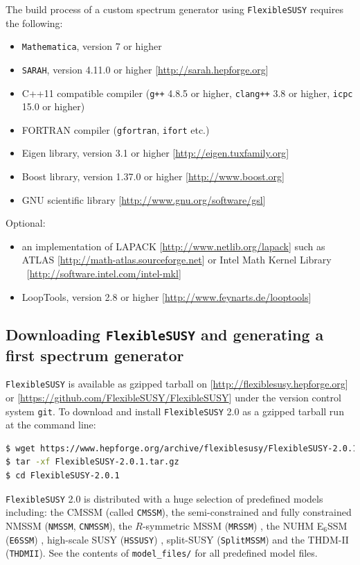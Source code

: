 \documentclass[final,3p,11pt,pdflatex]{elsarticle}
\makeatletter
\newcommand{\modelname}[1]{\texttt{#1}\@\xspace}
\newcommand{\sarah}{\texttt{SARAH}\@\xspace}
\newcommand{\fs}{\texttt{FlexibleSUSY}\@\xspace}
\newcommand{\HSSUSY}{\modelname{HSSUSY}}
\newcommand{\fstwo}{\fs 2.0\@\xspace}
\newcommand{\mathematica}{\texttt{Ma\-the\-ma\-ti\-ca}\xspace}
\newcommand{\ESSM}{E$_6$SSM\@\xspace}
\newcommand{\code}[1]{\lstinline|#1|}  %
\makeatother
\begin{document}
The build process of a custom spectrum generator using \fs requires
the following:
%
\begin{itemize}
\item \mathematica, version 7 or higher
\item \sarah, version 4.11.0 or higher [\url{http://sarah.hepforge.org}]
\item C++11 compatible compiler (\texttt{g++} 4.8.5 or higher,
  \texttt{clang++} 3.8 or higher, \texttt{icpc} 15.0 or higher)
\item FORTRAN compiler (\texttt{gfortran}, \texttt{ifort} etc.)
\item Eigen library, version 3.1 or higher
  [\url{http://eigen.tuxfamily.org}]
\item Boost library, version 1.37.0 or higher
  [\url{http://www.boost.org}]
\item GNU scientific library [\url{http://www.gnu.org/software/gsl}]
\end{itemize}
%
Optional:
%
\begin{itemize}
\item an implementation of LAPACK [\url{http://www.netlib.org/lapack}]
  such as ATLAS [\url{http://math-atlas.sourceforge.net}] or
  Intel Math Kernel Library\\\ [\url{http://software.intel.com/intel-mkl}]
\item LoopTools, version 2.8 or higher
  [\url{http://www.feynarts.de/looptools}]
\end{itemize}

\subsection{Downloading \fs and generating a first spectrum generator}
\label{sec:quick-start-cmssm}
\fs is available as gzipped tarball on
[\url{http://flexiblesusy.hepforge.org}] or
[\url{https://github.com/FlexibleSUSY/FlexibleSUSY}] under the version
control system \texttt{git}.
%
To download and install \fstwo as a gzipped tarball run at the command
line:
%
\begin{lstlisting}[language=bash]
$ wget https://www.hepforge.org/archive/flexiblesusy/FlexibleSUSY-2.0.1.tar.gz
$ tar -xf FlexibleSUSY-2.0.1.tar.gz
$ cd FlexibleSUSY-2.0.1
\end{lstlisting}%
%
\fstwo is distributed with a huge selection of predefined models
including: the CMSSM (called \modelname{CMSSM}), the semi-constrained and
fully constrained NMSSM (\modelname{NMSSM}, \modelname{CNMSSM}), the
$R$-symmetric MSSM (\modelname{MRSSM}) \cite{Kribs:2007ac}, the NUHM \ESSM
(\modelname{E6SSM}) \cite{Athron:2007en}, high-scale SUSY (\HSSUSY)
\cite{Bagnaschi:2015pwa}, split-SUSY (\modelname{SplitMSSM})
\cite{Bagnaschi:2015pwa} and the THDM-II (\modelname{THDMII}).  See the
contents of \code{model_files/} for all predefined model files.
\end{document}

